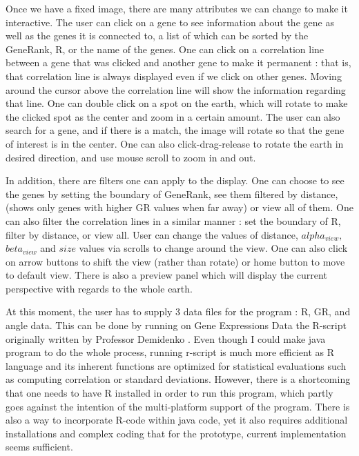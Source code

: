 \documentclass[]{article}
\begin{document}
Once we have a fixed image, there are many attributes we can change to make it interactive. The user can click on a gene to see information about the gene as well as the genes it is connected to, a list of which can be sorted by the GeneRank, R, or the name of the genes. One can click on a correlation line between a gene that was clicked and another gene to make it permanent : that is, that correlation line is always displayed even if we click on other genes. Moving around the cursor above the correlation line will show the information regarding that line. One can double click on a spot on the earth, which will rotate to make the clicked spot as the center and zoom in a certain amount. The user can also search for a gene, and if there is a match, the image will rotate so that the gene of interest is in the center. One can also click-drag-release to rotate the earth in desired direction, and use mouse scroll to zoom in and out.   

In addition, there are filters one can apply to the display. One can choose to see the genes by setting the boundary of GeneRank, see them filtered by distance,(shows only genes with higher GR values when far away) or view all of them. One can also filter the correlation lines in a similar manner : set the boundary of R, filter by distance, or view all. User can change the values of distance, $alpha_{view},$ $beta_{view}$ and $size$ values via scrolls to change around the view. One can also click on arrow buttons to shift the view (rather than rotate) or home button to move to default view. There is also a preview panel which will display the current perspective with regards to the whole earth.

At this moment, the user has to supply 3 data files for the program : R, GR, and angle data. This can be done by running on Gene Expressions Data the R-script originally written by Professor Demidenko . Even though I could make java program to do the whole process, running r-script is much more efficient as R language and its inherent functions are optimized for statistical evaluations such as computing correlation or standard deviations. However, there is a shortcoming that one needs to have R installed in order to run this program, which partly goes against the intention of the multi-platform support of the program. There is also a way to incorporate R-code within java code, yet it also requires additional installations and complex coding that for the prototype, current implementation seems sufficient.
\end{document}
